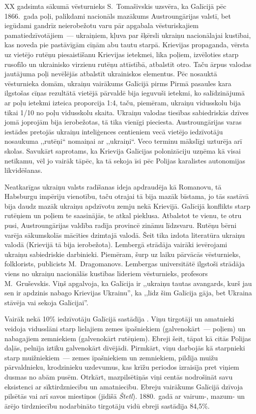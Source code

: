 \documentclass[twoside,a5paper,12pt,fleqn,openany]{extbook}
\newcommand{\pltxti}[1]{\textit{\textpolish{#1}}}
\begin{document}
XX gadsimta sākumā vēsturnieks S.~Tomašivskis uzsvēra, ka Galīcijā pēc 1866.~gada poļi, palikdami nacionāls mazākums Austroungārijas valstī, bet iegūdami gandrīz neierobežotu varu pār apgabala vēsturiskajiem pamatiedzīvotājiem~--- ukraiņiem, kļuva par šķērsli ukraiņu nacionālajai kustībai, kas noveda pie pastāvīgām cīņām abu tautu starpā. Krievijas propaganda, vērsta uz vietējo rutēņu piesaistīšanu Krievijas ietekmei, lika poļiem, izvēloties starp rusofīlo un ukrainisko virzienu rutēņu attīstībā, atbalstīt otro. Taču ārpus valodas jautājuma poļi nevēlējās atbalstīt ukrainiskos elementus. Pēc nosauktā vēsturnieka domām, ukraiņu vairākums Galīcijā pirms Pirmā pasaules kara ilgstošas cīņas rezultātā vietējā pārvaldē bija ieguvuši ietekmi, ko salīdzinājumā ar poļu ietekmi izteica proporcija 1:4, taču, piemēram, ukraiņu vidusskolu bija tikai 1/10 no poļu vidusskolu skaita. Ukraiņu valodas tiesības sabiedriskās dzīves jomā joprojām bija ierobežotas, tā tika vienīgi pieciesta. Austroungārijas varas iestādes pretojās ukraiņu inteliģences centieniem vecā vietējo iedzīvotāju nosaukuma ,,rutēņi“ nomaiņai ar ,,ukraiņi“. Veco terminu mākslīgi uzturēja arī skolas. Savukārt saprotams, ka Krievija Galīcijas polonizāciju uzņēma kā visai netīkamu, vēl jo vairāk tāpēc, ka tā sekoja īsi pēc Polijas karalistes autonomijas likvidēšanas.

Neatkarīgas ukraiņu valsts radīšanas ideja apdraudēja kā Romanovu, tā Habsburgu impēriju vienotību, taču otrajai tā bija mazāk bīstama, jo tās sastāvā bija daudz mazāk ukraiņu apdzīvotu zemju nekā Krievijā. Galīcijā konflikts starp rutēņiem un poļiem te saasinājās, te atkal pieklusa. Atbalstot te vienu, te otru pusi, Austroungārijas valdība radīja provincē zināmu līdzsvaru. Rutēņu bērni varēja sākumskolās mācīties dzimtajā valodā. Šeit tika izdota literatūra ukraiņu valodā (Krievijā tā bija ierobežota). Lembergā strādāja vairāki ievērojami ukraiņu sabiedriskie darbinieki. Piemēram, šurp uz laiku pārvācās vēsturnieks, folklorists, publicists M.~Dragomanovs. Lembergas universitātē ilgstoši strādāja viens no ukraiņu nacionālās kustības līderiem vēsturnieks, profesors M.~Gruševskis. Viņš apgalvoja, ka Galīcija ir ,,ukraiņu tautas avangards, kurš jau sen ir apdzinis nabago Krievijas Ukrainu'', ka ,,līdz šim Galīcija gāja, bet Ukraina stāvēja vai sekoja Galīcijai''.

Vairāk nekā 10\% iedzīvotāju Galīcijā sastādīja . Viņu tirgotāji un amatnieki veidoja vidusslāni starp lielajiem zemes īpašniekiem (galvenokārt~--- poļiem) un nabagajiem zemniekiem (galvenokārt rutēņiem). Ebreji šeit, tāpat kā citās Polijas daļās, pelnīja iztiku galvenokārt divējādi. Pirmkārt, viņu darbojās kā starpnieki starp muižniekiem~--- zemes īpašniekiem un zemniekiem, pildīja muižu pārvaldnieku, krodzinieku uzdevumus, kas krīžu periodos izraisīja pret viņiem dusmas no abām pusēm. Otrkārt, mazpilsētiņās viņi centās nodrošināt savu eksistenci ar sīktirdzniecību un amatniecību. Ebreju vairākums Galīcijā dzīvoja pilsētās vai arī savos miestiņos (jidišā \pltxti{Štetl}). 1880.~gadā ar vairum-, mazum- un ārējo tirdzniecību nodarbināto tirgotāju vidū ebreji sastādīja 84,5\%.
\end{document}
